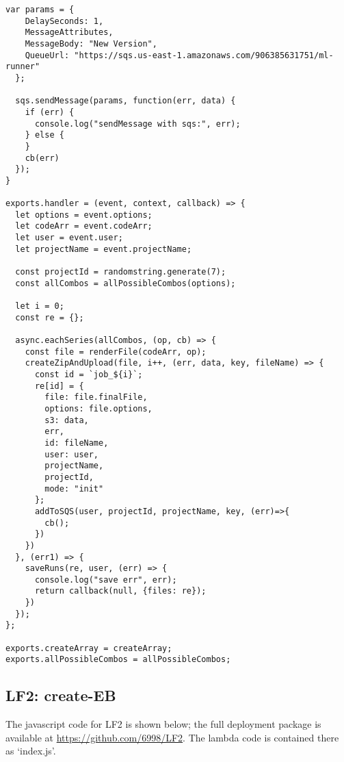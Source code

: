 \documentclass[12pt,oneside]{amsart}
\begin{document}
\begin{Verbatim}[fontsize=\tiny, frame=single]
  var params = {
    DelaySeconds: 1,
    MessageAttributes,
    MessageBody: "New Version",
    QueueUrl: "https://sqs.us-east-1.amazonaws.com/906385631751/ml-runner"
  };

  sqs.sendMessage(params, function(err, data) {
    if (err) {
      console.log("sendMessage with sqs:", err);
    } else {
    }
    cb(err)
  });
}

exports.handler = (event, context, callback) => {
  let options = event.options;
  let codeArr = event.codeArr;
  let user = event.user;
  let projectName = event.projectName;

  const projectId = randomstring.generate(7);
  const allCombos = allPossibleCombos(options);

  let i = 0;
  const re = {};

  async.eachSeries(allCombos, (op, cb) => {
    const file = renderFile(codeArr, op);
    createZipAndUpload(file, i++, (err, data, key, fileName) => {
      const id = `job_${i}`;
      re[id] = {
        file: file.finalFile,
        options: file.options,
        s3: data,
        err,
        id: fileName,
        user: user,
        projectName,
        projectId,
        mode: "init"
      };
      addToSQS(user, projectId, projectName, key, (err)=>{
        cb();
      })
    })
  }, (err1) => {
    saveRuns(re, user, (err) => {
      console.log("save err", err);
      return callback(null, {files: re});
    })
  });
};

exports.createArray = createArray;
exports.allPossibleCombos = allPossibleCombos;
\end{Verbatim}

\subsection{LF2: create-EB} \label{code:lf2}
The javascript code for LF2 is shown below; the full deployment package is available at \url{https://github.com/6998/LF2}.
The lambda code is contained there as `index.js'.
\end{document}

